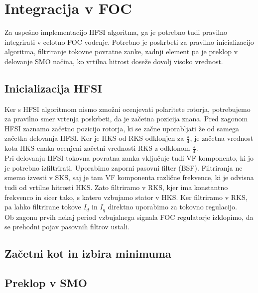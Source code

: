 \documentclass[a4paper,twoside,openright,12pt,slovene]{book}
\begin{document}
\chapter{Integracija v FOC} \label{integracija}

Za uspešno implementacijo HFSI algoritma, ga je potrebno tudi pravilno integrirati v celotno FOC vodenje. Potrebno je poskrbeti za pravilno inicializacijo algoritma, filtriranje tokovne povratne
zanke, zadnji element pa je preklop v delovanje SMO načina, ko vrtilna hitrost doseže dovolj visoko vrednost.

\section{Inicializacija HFSI}

Ker s HFSI algoritmom nismo zmožni ocenjevati polaritete rotorja, potrebujemo za pravilno smer vrtenja poskrbeti, da je začetna pozicija znana. Pred zagonom HFSI zaznamo začetno pozicijo rotorja, ki
se začne uporabljati že od samega začetka delovanja HFSI. Ker je HKS od RKS odklonjen za $\frac{\pi}{4}$, je začetna vrednost kota HKS enaka ocenjeni začetni vrednosti RKS z odklonom $\frac{\pi}{4}$.
\\
Pri delovanju HFSI tokovna povratna zanka vključuje tudi VF komponento, ki jo je potrebno izfiltrirati. Uporabimo zaporni pasovni filter (BSF). Filtriranja ne smemo izvesti v SKS, saj je tam VF
komponenta različne frekvence, ki je odvisna tudi od vrtilne hitrosti HKS. Zato filtriramo v RKS, kjer ima konstantno frekvenco in sicer tako, s katero vzbujamo stator v HKS. Ker filtriramo v RKS, pa
lahko filtrirane tokove $I_d$ in $I_q$ direktno uporabimo za tokovno regulacijo. 
\\
Ob zagonu prvih nekaj period vzbujalnega signala FOC regulatorje izklopimo, da se prehodni pojav pasovnih filtrov ustali. 

\section{Začetni kot in izbira minimuma}

\section{Preklop v SMO}
\end{document}

